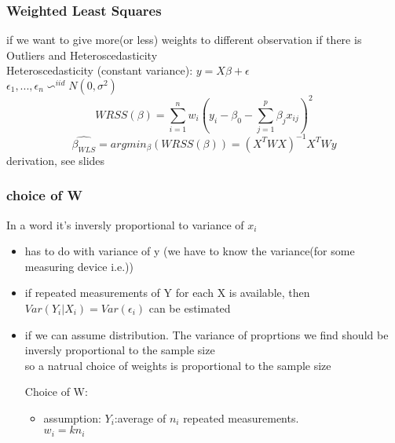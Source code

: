 \documentclass[10pt]{article}
\theoremstyle{break}
\begin{document}
        \subsubsection{Weighted Least Squares}
            if we want to give more(or less) weights to different observation if there is Outliers and Heteroscedasticity
            \\Heteroscedasticity (constant variance): $y=X\beta + \epsilon$  
            \\$\epsilon_1,...,\epsilon_n \backsim^{iid} N(0, \sigma^2)  $
            $$WRSS(\beta) = \sum^n_{i=1}w_i\left(y_i-\beta_0-\sum^p_{j=1}\beta_j x_{ij}\right)^2$$
            $$\hat{\beta_{WLS}} = argmin_\beta(WRSS(\beta)) = (X^TWX)^{-1}X^TWy$$
            derivation, see slides
        \subsubsection{choice of W}
            In a word it's inversly proportional to variance of $x_i$
            \begin{itemize}
                \item has to do with variance of y (we have to know the variance(for some measuring device i.e.))
                \item if repeated measurements of Y for each X is available, then $Var(Y_i|X_i)=Var(\epsilon_i)$
                        can be estimated
                \item if we can assume distribution. The variance of proprtions we find should be inversly proportional to the sample size\\
                        so a natrual choice of weights is proportional to the sample size
                
                Choice of W:
                \begin{itemize}
                    \item assumption: $Y_i$:average of $n_i$ repeated measurements.\\$w_i = k n_i$
                \end{itemize}
            \end{itemize}
\end{document}
